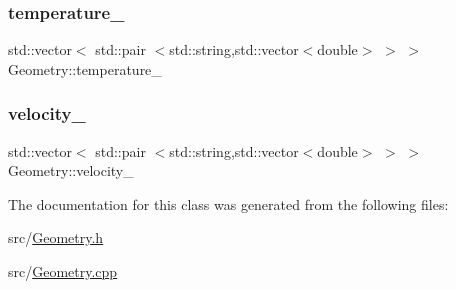 \subsubsection{\texorpdfstring{temperature\_}{temperature\_}}
{\footnotesize\ttfamily std\+::vector$<$ std\+::pair $<$std\+::string,std\+::vector$<$double$>$ $>$ $>$ Geometry\+::temperature\+\_\+}

\mbox{\label{classGeometry_adde4eef1bb57cd649f60a44d41950f43}} 
\subsubsection{\texorpdfstring{velocity\_}{velocity\_}}
{\footnotesize\ttfamily std\+::vector$<$ std\+::pair $<$std\+::string,std\+::vector$<$double$>$ $>$ $>$ Geometry\+::velocity\+\_\+}



The documentation for this class was generated from the following files\+:\begin{DoxyCompactItemize}
\item 
src/\mbox{\hyperlink{Geometry_8h}{Geometry.\+h}}\item 
src/\mbox{\hyperlink{Geometry_8cpp}{Geometry.\+cpp}}\end{DoxyCompactItemize}
